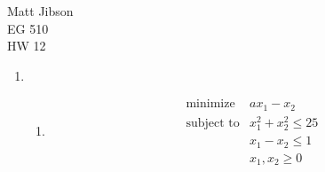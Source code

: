 \documentclass{article}
\begin{document}
\begin{flushright}
Matt Jibson \\
EG 510 \\
HW 12
\end{flushright}

\begin{enumerate}
	\item
		\begin{enumerate}
			\item
				\begin{displaymath}
					\begin{array}{ll}
					\textrm{minimize} & a x_1 - x_2 \\
					\textrm{subject to} & x_1^2 + x_2^2 \le 25 \\
					& x_1 - x_2 \le 1 \\
					& x_1, x_2 \ge 0
					\end{array}
				\end{displaymath}
		\end{enumerate}
\end{enumerate}
\end{document}
